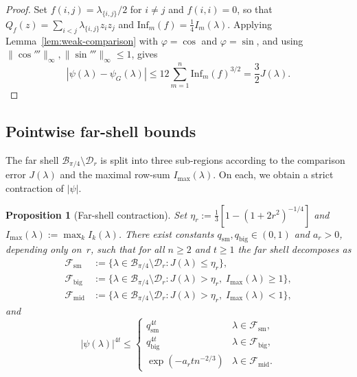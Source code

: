\documentclass[11pt]{article}
\newtheorem{proposition}[theorem]{Proposition}
\theoremstyle{definition}
\newcommand{\Bbox}{\mathcal{B}}
\newcommand{\Dd}{\mathcal{D}}
\begin{document}
\begin{proof}
Set \(f(i,j)=\lambda_{\{i,j\}}/2\) for \(i\ne j\) and \(f(i,i)=0\), so that
\(Q_f(z)=\sum_{i<j}\lambda_{\{i,j\}}z_i z_j\) and
\(\mathrm{Inf}_m(f)=\tfrac14 I_m(\lambda)\).
Applying Lemma~\ref{lem:weak-comparison} with \(\varphi=\cos\) and
\(\varphi=\sin\), and using \(\|\cos'''\|_\infty,\|\sin'''\|_\infty\le 1\), gives
\[
  |\psi(\lambda)-\psi_G(\lambda)|
  \le 12\sum_{m=1}^n \mathrm{Inf}_m(f)^{3/2}
  =\frac32 J(\lambda).
\]
\end{proof}

\subsection{Pointwise far-shell bounds}

The far shell \(\Bbox_{\pi/4}\setminus\Dd_r\) is split into three sub-regions according to the comparison error \(J(\lambda)\) and the maximal row-sum \(I_{\max}(\lambda)\). On each, we obtain a strict contraction of \(|\psi|\).

\begin{proposition}[Far-shell contraction]\label{prop:far-shell}
Set \(\eta_r:=\tfrac{1}{3}[1-(1+2r^2)^{-1/4}]\) and \(I_{\max}(\lambda):=\max_k I_k(\lambda)\). There exist constants \(q_{\mathrm{sm}},q_{\mathrm{big}}\in(0,1)\) and \(a_r>0\), depending only on~\(r\), such that for all \(n\ge 2\) and \(t\ge 1\) the far shell decomposes as
\[
  \begin{aligned}
  \mathcal F_{\mathrm{sm}}
    &:=\{\lambda\in\Bbox_{\pi/4}\setminus\Dd_r:J(\lambda)\le \eta_r\},\\
  \mathcal F_{\mathrm{big}}
    &:=\{\lambda\in\Bbox_{\pi/4}\setminus\Dd_r:J(\lambda)>\eta_r,\;I_{\max}(\lambda)\ge 1\},\\
  \mathcal F_{\mathrm{mid}}
    &:=\{\lambda\in\Bbox_{\pi/4}\setminus\Dd_r:J(\lambda)>\eta_r,\;I_{\max}(\lambda)<1\},
  \end{aligned}
\]
and
\[
  |\psi(\lambda)|^{4t}\le
  \begin{cases}
    q_{\mathrm{sm}}^{4t} & \lambda\in\mathcal F_{\mathrm{sm}},\\[3pt]
    q_{\mathrm{big}}^{4t} & \lambda\in\mathcal F_{\mathrm{big}},\\[3pt]
    \exp(-a_r t n^{-2/3}) & \lambda\in\mathcal F_{\mathrm{mid}}.
  \end{cases}
\]
\end{proposition}
\end{document}
